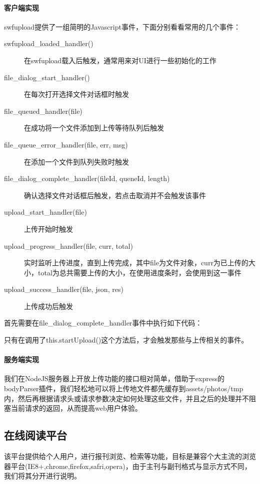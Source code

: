 \paragraph{客户端实现}
swfupload提供了一组简明的Javascript事件，下面分别看看常用的几个事件：
\begin{description}
	\item[swfupload\_loaded\_handler()] 在swfupload载入后触发，通常用来对UI进行一些初始化的工作
	\item[file\_dialog\_start\_handler()] 在每次打开选择文件对话框时触发
	\item[file\_queued\_handler(file)] 在成功将一个文件添加到上传等待队列后触发
	\item[file\_queue\_error\_handler(file, err, msg)] 在添加一个文件到队列失败时触发
	\item[file\_dialog\_complete\_handler(fileId, queneId, length)] 确认选择文件对话框后触发，若点击取消并不会触发该事件
	\item[upload\_start\_handler(file)] 上传开始时触发
	\item[upload\_progress\_handler(file, curr, total)] 实时监听上传进度，直到上传完成，其中file为文件对象，curr为已上传的大小，total为总共需要上传的大小，在使用进度条时，会使用到这一事件
	\item[upload\_success\_handler(file, json, res)] 上传成功后触发
\end{description}

\noindent
首先需要在file\_dialog\_complete\_handler事件中执行如下代码：


\indent
只有在调用了this.startUpload()这个方法后，才会触发那些与上传相关的事件。

\paragraph{服务端实现}
我们在NodeJS服务器上开放上传功能的接口相对简单，借助于express的bodyParser插件，我们轻松地可以将上传地文件都先缓存到assets/photos/tmp内，然后再根据请求头或请求参数决定如何处理这些文件，并且之后的处理并不阻塞当前请求的返回，从而提高web用户体验。


\subsection{在线阅读平台}
该平台提供给个人用户，进行报刊浏览、检索等功能，目标是兼容个大主流的浏览器平台(IE8+,chrome,firefox,safri,opera)，由于主刊与副刊格式与显示方式不同，我们将其分开进行说明。

